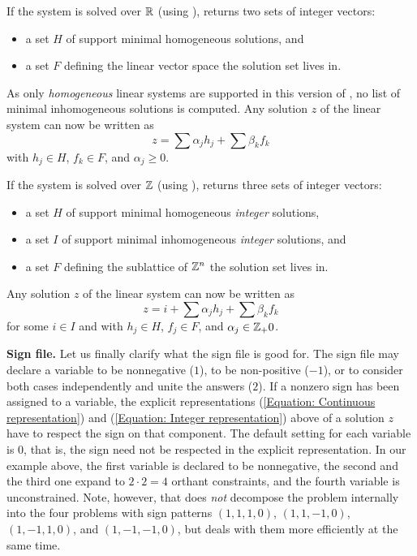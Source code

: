 If the system is solved over $\mathbb R$ (using ),
\FourTiTwo{} returns two sets of integer vectors:
\begin{itemize}
\item a set $H$ of support minimal homogeneous solutions, and
\item a set $F$ defining the linear vector space the solution set
lives in.
\end{itemize}
As only \emph{homogeneous} linear systems are supported in this
version of \FourTiTwo, no list of minimal inhomogeneous solutions is
computed. Any solution $z$ of the linear system can now be written
as
\begin{equation}\label{Equation: Continuous representation}
z=\sum \alpha_j h_j+ \sum \beta_k f_k
\end{equation}
with $h_j\in H$, $f_k\in F$, and $\alpha_j\geq 0$.

If the system is solved over $\mathbb Z$ (using ),
\FourTiTwo{} returns three sets of integer vectors:
\begin{itemize}
\item a set $H$ of support minimal homogeneous \emph{integer} solutions,
\item a set $I$ of support minimal inhomogeneous \emph{integer}
solutions, and
\item a set $F$ defining the sublattice of $\mathbb Z^n$ the solution set
lives in.
\end{itemize}
Any solution $z$ of the linear system can now be written as
\begin{equation}\label{Equation: Integer representation}
z=i+ \sum \alpha_j h_j+\sum \beta_k f_k
\end{equation}
for some $i\in I$ and with $h_j\in H$, $f_j\in F$, and
$\alpha_j\in\mathbb Z_+0$.

{\bf Sign file.} Let us finally clarify what the sign file
 is good for. The sign file may declare a variable
to be nonnegative ($1$), to be non-positive ($-1$), or to consider
both cases independently and unite the answers ($2$). If a nonzero
sign has been assigned to a variable, the explicit representations
(\ref{Equation: Continuous representation}) and (\ref{Equation:
Integer representation}) above of a solution $z$ have to respect the
sign on that component. The default setting for each variable is
$0$, that is, the sign need not be respected in the explicit
representation. In our example above, the first variable is declared
to be nonnegative, the second and the third one expand to $2\cdot
2=4$ orthant constraints, and the fourth variable is unconstrained.
Note, however, that \FourTiTwo{} does \emph{not} decompose the
problem internally into the four problems with sign patterns
$(1,1,1,0)$, $(1,1,-1,0)$, $(1,-1,1,0)$, and $(1,-1,-1,0)$, but
deals with them more efficiently at the same time.



